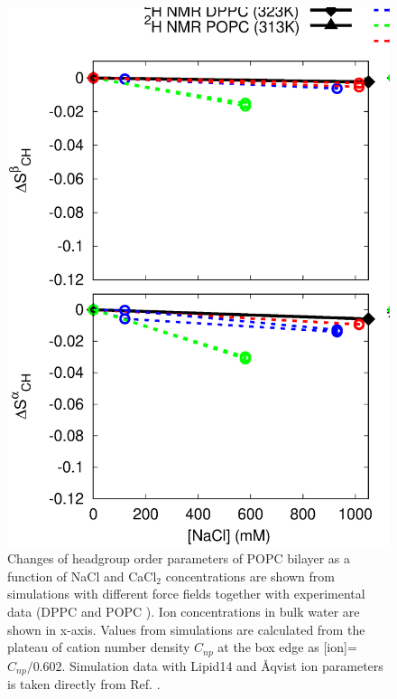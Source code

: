 \documentclass[aip,jcp,twocolumn]{revtex4}
\begin{document}
\begin{figure}[tbp]
  \centering
  \includegraphics[width=16.0cm]{../Fig/OrdParChanges_NaCl_CaCl2.eps}
  \caption{\label{OrderParameterCHANGESnewMODELS}
    Changes of headgroup order parameters of POPC bilayer as a function of NaCl and CaCl$_2$ concentrations
    are shown from simulations with different force fields together with experimental data 
    (DPPC \cite{akutsu81} and POPC \cite{altenbach84}). 
    Ion concentrations in bulk water are shown in x-axis. 
    Values from simulations are calculated from the plateau of cation number density $C_{np}$
    at the box edge as [ion]=$C_{np}/0.602$.
    Simulation data with Lipid14 and \AA{}qvist ion parameters is taken directly from Ref. \cite{catte16}.
  }
\end{figure}
\end{document}
